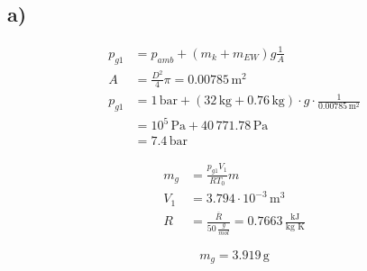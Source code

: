 

\subsection*{a)}

\begin{align*}
    p_{g1} &= p_{amb} + (m_k + m_{EW}) g \frac{1}{A} \\
    A &= \frac{D^2}{4} \pi = 0.00785 \, \text{m}^2 \\
    p_{g1} &= 1 \, \text{bar} + (32 \, \text{kg} + 0.76 \, \text{kg}) \cdot g \cdot \frac{1}{0.00785 \, \text{m}^2} \\
    &= 10^5 \, \text{Pa} + 40 \, 771.78 \, \text{Pa} \\
    &= \boxed{7.4 \, \text{bar}}
\end{align*}

\begin{align*}
    m_g &= \frac{p_{g1} V_1}{R T_0} m \\
    V_1 &= 3.794 \cdot 10^{-3} \, \text{m}^3 \\
    R &= \frac{\overline{R}}{50 \, \frac{g}{mol}} = \boxed{0.7663 \, \frac{\text{kJ}}{\text{kg K}}}
\end{align*}

\[
    m_g = \boxed{3.919 \, \text{g}}
\]